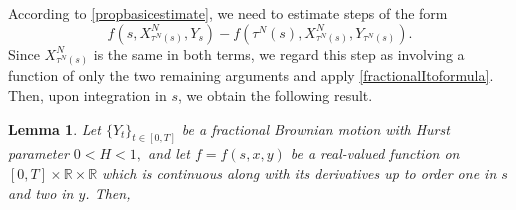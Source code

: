 \documentclass[reqno,12pt]{amsart}
\theoremstyle{plain}%
\newtheorem{lem}{Lemma}[section]
\theoremstyle{definition}
\begin{document}
According to \cref{propbasicestimate}, we need to estimate steps of the form
\[
    f(s, X_{\tau^N(s)}^N, Y_s) - f(\tau^N(s), X_{\tau^N(s)}^N, Y_{\tau^N(s)}).
\]
Since $X_{\tau^N(s)}^N$ is the same in both terms, we regard this step as involving a function of only the two remaining arguments and apply \eqref{fractionalItoformula}. Then, upon integration in $s$, we obtain the following result.

\begin{lem}
    \label{lemsinglestepwithfBm}
    Let $\{Y_t\}_{t\in [0, T]}$ be a fractional Brownian motion with Hurst parameter $0 < H < 1,$ and let $f=f(s, x, y)$ be a real-valued function on $[0, T]\times\mathbb{R}\times \mathbb{R}$ which is continuous along with its derivatives up to order one in $s$ and two in $y$. Then,
\end{lem}
\end{document}

